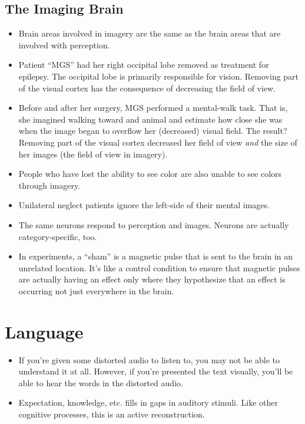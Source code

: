\documentclass[]{article}
\newcommand{\lecture}[1]{\marginpar{{\footnotesize $\leftarrow$ \underline{#1}}}}
\begin{document}
		\subsection{The Imaging Brain}
			\begin{itemize}
				\item Brain areas involved in imagery are the same as the brain areas that are involved with perception.
				\item Patient ``MGS'' had her right occipital lobe removed as treatment for epilepsy. The occipital lobe is primarily responsible for vision. Removing part of the visual cortex has the consequence of decreasing the field of view.
				\item Before and after her surgery, MGS performed a mental-walk task. That is, she imagined walking toward and animal and estimate how close she was when the image began to overflow her (decreased) visual field. The result? Removing part of the visual cortex decreased her field of view \emph{and} the size of her images (the field of view in imagery).
				\item People who have lost the ability to see color are also unable to see colors through imagery.
				\item Unilateral neglect patients ignore the left-side of their mental images.
				\item The same neurons respond to perception and images. Neurons are actually category-specific, too.
				\item In experiments, a ``sham'' is a magnetic pulse that is sent to the brain in an unrelated location. It's like a control condition to ensure that magnetic pulses are actually having an effect only where they hypothesize that an effect is occurring \textendash{} not just everywhere in the brain.
			\end{itemize}

	\section{Language} \lecture{March 12, 2013}
		\begin{itemize}
			\item If you're given some distorted audio to listen to, you may not be able to understand it at all. However, if you're presented the text visually, you'll be able to hear the words in the distorted audio.
			\item Expectation, knowledge, etc. fills in gaps in auditory stimuli. Like other cognitive processes, this is an active reconstruction.
		\end{itemize}
\end{document}
